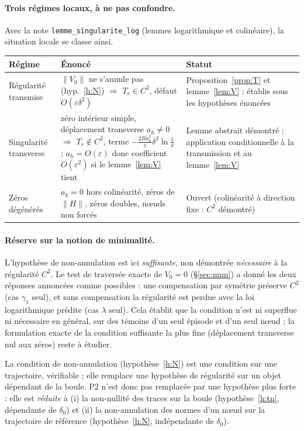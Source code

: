\documentclass[11pt,a4paper]{article}
\theoremstyle{remark}
\theoremstyle{definition}
\newcommand{\eps}{\varepsilon}
\begin{document}
\paragraph{Trois régimes locaux, à ne pas confondre.} Avec la note \texttt{lemme\_singularite\_log} (lemmes logarithmique et colinéaire), la situation locale se classe ainsi.
\begin{center}\small
\begin{tabular}{p{4.2cm}p{5.2cm}p{4.6cm}}
\hline
Régime & Énoncé & Statut\\\hline
Régularité transmise & $\lVert V_0\rVert$ ne s'annule pas (hyp.~\ref{h:N}) $\Rightarrow$ $T_r\in C^2$, défaut $O(\eps\delta^2)$ & Proposition~\ref{prop:T} et lemme~\ref{lem:V} : établis sous les hypothèses énoncées\\
Singularité transverse & zéro intérieur simple, déplacement transverse $a_h\ne0$ $\Rightarrow$ $T_r\notin C^2$, terme $-\frac{2Ba_h^2}{v}\delta^2\ln\frac1\delta$ ; $a_h=O(\eps)$ donc coefficient $O(\eps^2)$ si le lemme~\ref{lem:V} tient & Lemme abstrait démontré ; application conditionnelle à la transmission et au lemme~\ref{lem:V}\\
Zéros dégénérés & $a_k=0$ hors colinéarité, zéros de $\lVert H\rVert$, zéros doubles, n\oe uds non forcés & Ouvert (colinéarité à direction fixe : $C^2$ démontré)\\\hline
\end{tabular}
\end{center}

\paragraph{Réserve sur la notion de minimalité.} L'hypothèse de non-annulation est ici \emph{suffisante}, non démontrée \emph{nécessaire} à la régularité $C^2$. Le test de traversée exacte de $V_0=0$ (§\ref{sec:num}) a donné les deux réponses annoncées comme possibles : une compensation par symétrie préserve $C^2$ (cas $\gamma_1$ seul), et sans compensation la régularité est perdue avec la loi logarithmique prédite (cas $\lambda$ seul). Cela établit que la condition n'est ni superflue ni nécessaire en général, sur des témoins d'un seul épisode et d'un seul n\oe ud ; la formulation exacte de la condition suffisante la plus fine (déplacement transverse nul aux zéros) reste à étudier.

La condition de non-annulation (hypothèse~\ref{h:N}) est une condition sur une trajectoire, vérifiable ; elle remplace une hypothèse de régularité sur un objet dépendant de la boule. P2 n'est donc pas remplacée par une hypothèse plus forte : elle est \emph{réduite} à (i) la non-nullité des traces sur la boule (hypothèse~\ref{h:tn}, dépendante de $\delta_0$) et (ii) la non-annulation des normes d'un n\oe ud sur la trajectoire de référence (hypothèse~\ref{h:N}, indépendante de $\delta_0$).
\end{document}

